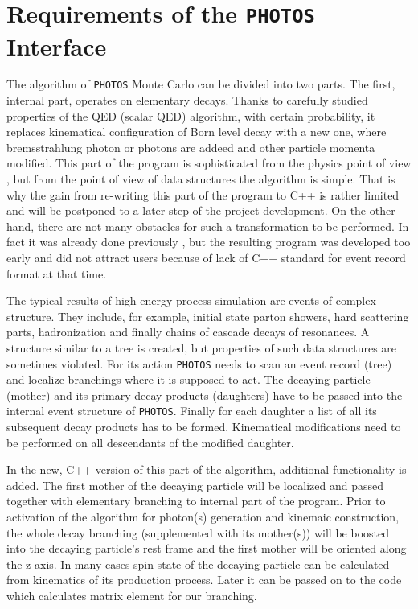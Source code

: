 \documentclass[]{Photos_interface_design}
\begin{document}
\section{Requirements of the {\tt PHOTOS} Interface}
\label{sec:requrements}
The algorithm of {\tt PHOTOS} Monte Carlo can be divided into two parts.
The first, internal part, operates on elementary decays. Thanks to carefully 
studied properties of the 
QED (scalar QED) algorithm, with certain probability, 
it replaces kinematical configuration of Born level decay with a new one, 
where bremsstrahlung photon or photons
are addeed and other particle momenta modified. This part of the program is sophisticated from the physics 
point of view \cite{Nanava:2006vv,Golonka:2006tw},
but from the point of view of data structures the algorithm is simple.
That is why the gain from re-writing this part of the program to C++ is rather
limited and will be postponed to a later step of the project development.
On the other hand, there are not many obstacles for such a transformation to be
performed. In fact it was already done
previously \cite{photosplus}, but the resulting program was developed too early 
and did not attract users because of lack of C++ standard for event record format at that time.

The typical results of high energy process simulation are events of complex structure.
They include, for example, initial state parton showers, hard scattering parts,
hadronization and finally chains of cascade decays of resonances. 
A structure similar to a tree is created, but properties of such data structures
are sometimes violated.
For its action {\tt PHOTOS} needs to scan an event record (tree) 
and localize branchings where
it is supposed to act. The decaying particle (mother) and its primary decay products
(daughters) have to be passed into the internal event structure of {\tt PHOTOS}. 
Finally for each daughter a list of all its subsequent decay products has to be 
formed. Kinematical modifications need to be performed on all descendants of the modified daughter.

In the new, C++ version of this part of the algorithm, additional functionality
is added.
The first mother of the decaying particle will be localized and passed together with  
elementary branching to internal part of the program. 
Prior to activation of the algorithm for  photon(s) generation and kinemaic construction,
 the whole decay branching 
(supplemented with its mother(s))
will be boosted into the decaying particle's rest frame and the first mother
will be oriented along the z axis. 
In many cases spin state of the decaying particle  can be calculated from kinematics of its production process.
Later it can be passed on to the code which calculates matrix element for our branching.
\end{document}
